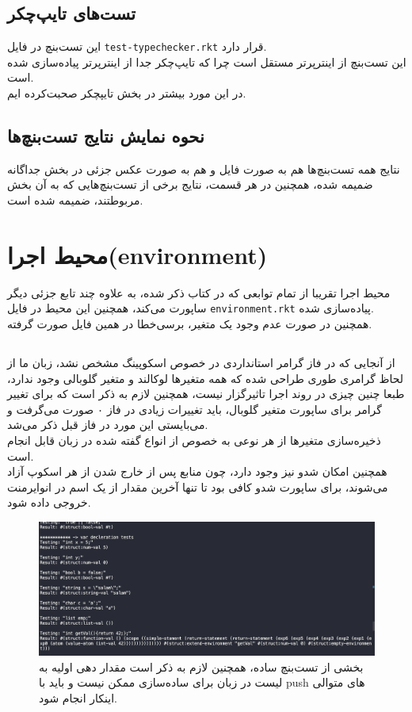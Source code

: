 \documentclass{article}
\begin{document}
\subsection{تست‌های تایپ‌چکر}
این تست‌بنچ در فایل
\texttt{test-typechecker.rkt}
قرار دارد.
\\
این تست‌بنچ از اینترپرتر مستقل است چرا که تایپ‌چکر جدا از اینترپرتر پیاده‌سازی شده است.
\\
در این مورد بیشتر در بخش تایپچکر صحبت‌کرده ایم.
\subsection{نحوه نمایش نتایج تست‌بنچ‌ها}
نتایج همه تست‌بنچ‌ها هم به صورت فایل و هم به صورت عکس جزئی در بخش جداگانه ضمیمه شده، همچنین 
در هر قسمت، نتایج برخی از تست‌بنچ‌هایی که 
به آن بخش مربوطتند، ضمیمه شده است.
\section{محیط‌ اجرا(environment)}
محیط اجرا تقریبا از تمام توابعی که در کتاب ذکر شده، به علاوه چند تابع جزئی دیگر ساپورت می‌کند، همچنین این محیط در فایل 
\texttt{environment.rkt}
پیاده‌سازی شده.
\\
همچنین در صورت عدم وجود یک متغیر، برسی‌خطا در همین فایل صورت گرفته.
\subsection{}
از آنجایی که در فاز گرامر استانداردی در خصوص اسکوپینگ مشخص نشد، زبان ما از لحاظ گرامری طوری طراحی شده که همه متغیر‌ها لوکالند و متغیر گلوبالی وجود ندارد، 
طبعا چنین چیزی در روند اجرا تاثیرگزار نیست، همچنین لازم‌ به ذکر است که برای تغییر گرامر برای ساپورت متغیر گلوبال، باید تغییرات زیادی در فاز ۰ صورت می‌گرفت و می‌بایستی این مورد در فاز قبل ذکر می‌شد.
\\
ذخیره‌سازی متغیر‌ها از هر نوعی به خصوص از انواع گفته شده در زبان قابل انجام است.
\\
همچنین امکان شدو نیز وجود دارد،
چون منابع پس از خارج شدن از هر اسکوپ آزاد می‌شوند، 
برای ساپورت شدو کافی بود تا تنها آخرین مقدار از یک اسم در انوایرمنت خروجی داده شود.
\begin{figure}[h]
        \centering
        \includegraphics[width=1\linewidth]{pics/var1.png}
        \caption{بخشی از تست‌بنچ ساده، همچنین لازم به ذکر است مقدار دهی اولیه به لیست در زبان برای‌ ساده‌سازی ممکن نیست و باید با push های متوالی اینکار انجام شود.}
\end{figure}
\end{document}

